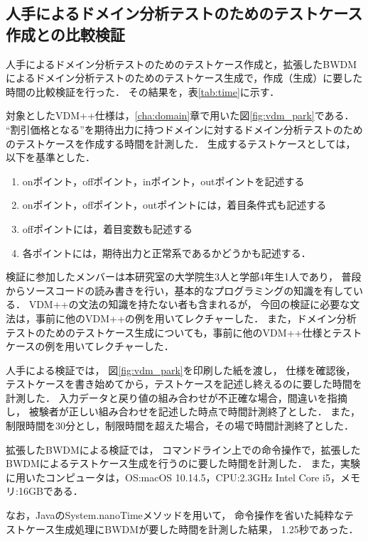\documentclass[uplatex, report, a4j, 10pt]{jsbook}
\begin{document}
\subsection{人手によるドメイン分析テストのためのテストケース作成との比較検証}

人手によるドメイン分析テストのためのテストケース作成と，拡張したBWDMによるドメイン分析テストのためのテストケース生成で，作成（生成）に要した時間の比較検証を行った．
その結果を，表\ref{tab:time}に示す．

対象としたVDM++仕様は，\ref{cha:domain}章で用いた図\ref{fig:vdm_park}である．
“割引価格となる”を期待出力に持つドメインに対するドメイン分析テストのためのテストケースを作成する時間を計測した．
生成するテストケースとしては，以下を基準とした．
\begin{enumerate}
  \item onポイント，offポイント，inポイント，outポイントを記述する
  \item onポイント，offポイント，outポイントには，着目条件式も記述する
  \item offポイントには，着目変数も記述する
  \item 各ポイントには，期待出力と正常系であるかどうかも記述する．
\end{enumerate}

検証に参加したメンバーは本研究室の大学院生3人と学部4年生1人であり，
普段からソースコードの読み書きを行い，基本的なプログラミングの知識を有している．
VDM++の文法の知識を持たない者も含まれるが，
今回の検証に必要な文法は，事前に他のVDM++の例を用いてレクチャーした．
また，ドメイン分析テストのためのテストケース生成についても，事前に他のVDM++仕様とテストケースの例を用いてレクチャーした．

人手による検証では，
図\ref{fig:vdm_park}を印刷した紙を渡し，
仕様を確認後，
テストケースを書き始めてから，テストケースを記述し終えるのに要した時間を計測した．
入力データと戻り値の組み合わせが不正確な場合，間違いを指摘し，
被験者が正しい組み合わせを記述した時点で時間計測終了とした．
また，制限時間を30分とし，制限時間を超えた場合，その場で時間計測終了とした．

拡張したBWDMによる検証では，
コマンドライン上での命令操作で，拡張したBWDMによるテストケース生成を行うのに要した時間を計測した．
また，実験に用いたコンピュータは，OS:macOS 10.14.5，CPU:2.3GHz Intel Core i5，メモリ:16GBである．

なお，JavaのSystem.nanoTime\cite{nanotime}メソッドを用いて，
命令操作を省いた純粋なテストケース生成処理にBWDMが要した時間を計測した結果，
1.25秒であった．
\end{document}
